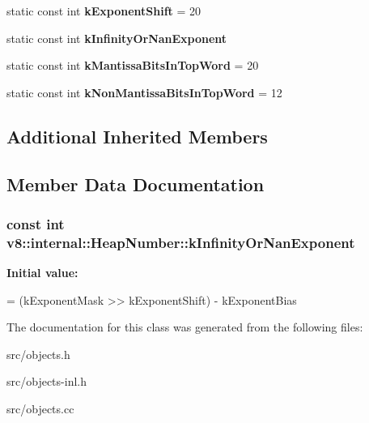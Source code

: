 \begin{DoxyCompactItemize}
\item 
\hypertarget{classv8_1_1internal_1_1_heap_number_aa70a7fa7eb34d309e4cfac3c2954650b}{}static const int {\bfseries k\+Exponent\+Shift} = 20\label{classv8_1_1internal_1_1_heap_number_aa70a7fa7eb34d309e4cfac3c2954650b}

\item 
static const int {\bfseries k\+Infinity\+Or\+Nan\+Exponent}
\item 
\hypertarget{classv8_1_1internal_1_1_heap_number_a6198e16a781f4aa92fcc8babace8f5ea}{}static const int {\bfseries k\+Mantissa\+Bits\+In\+Top\+Word} = 20\label{classv8_1_1internal_1_1_heap_number_a6198e16a781f4aa92fcc8babace8f5ea}

\item 
\hypertarget{classv8_1_1internal_1_1_heap_number_af83833ed477b0b07a40419938d43e406}{}static const int {\bfseries k\+Non\+Mantissa\+Bits\+In\+Top\+Word} = 12\label{classv8_1_1internal_1_1_heap_number_af83833ed477b0b07a40419938d43e406}

\end{DoxyCompactItemize}
\subsection*{Additional Inherited Members}


\subsection{Member Data Documentation}
\hypertarget{classv8_1_1internal_1_1_heap_number_a35bb7c72d798b1e4c47339a61dfa1f33}{}
\subsubsection[{k\+Infinity\+Or\+Nan\+Exponent}]{\setlength{\rightskip}{0pt plus 5cm}const int v8\+::internal\+::\+Heap\+Number\+::k\+Infinity\+Or\+Nan\+Exponent\hspace{0.3cm}{\ttfamily [static]}}\label{classv8_1_1internal_1_1_heap_number_a35bb7c72d798b1e4c47339a61dfa1f33}
{\bfseries Initial value\+:}
\begin{DoxyCode}
=
      (kExponentMask >> kExponentShift) - kExponentBias
\end{DoxyCode}


The documentation for this class was generated from the following files\+:\begin{DoxyCompactItemize}
\item 
src/objects.\+h\item 
src/objects-\/inl.\+h\item 
src/objects.\+cc\end{DoxyCompactItemize}

